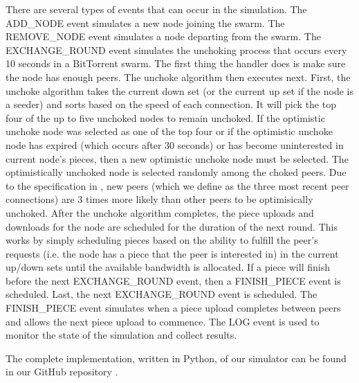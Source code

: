 There are several types of events that can occur in the simulation. The ADD\_NODE event simulates a new
node joining the swarm.  The REMOVE\_NODE event simulates a node departing
from the swarm. The EXCHANGE\_ROUND event simulates the unchoking process
that occurs every 10 seconds in a BitTorrent swarm. The first thing the
handler does is make sure the node has enough peers. The unchoke algorithm
then executes next. First, the unchoke algorithm takes the current down
set (or the current up set if the node is a seeder) and sorts based on
the speed of each connection.  It will pick the top four of the up to
five unchoked nodes to remain unchoked. If the optimistic unchoke node
was selected as one of the top four or if the optimistic unchoke node
has expired (which occurs after 30 seconds) or has become uninterested
in current node's pieces, then a new optimistic unchoke node must be
selected. The optimistically unchoked node is selected randomly among
the choked peers. Due to the specification in \cite{bep003}, new peers
(which we define as the three most recent peer connections) are 3 times
more likely than other peers to be optimisically unchoked.  After the
unchoke algorithm completes, the piece uploads and downloads for the node
are scheduled for the duration of the next round. This works by simply
scheduling pieces based on the ability to fulfill the peer's requests
(i.e. the node has a piece that the peer is interested in) in the current
up/down sets until the available bandwidth is allocated. If a piece
will finish before the next EXCHANGE\_ROUND event, then a FINISH\_PIECE
event is scheduled. Last, the next EXCHANGE\_ROUND event is scheduled.
The FINISH\_PIECE event simulates when a piece upload completes between
peers and allows the next piece upload to commence. The LOG event is
used to monitor the state of the simulation and collect results.

The complete implementation, written in Python, of our simulator can be found in our GitHub repository \cite{github}.
